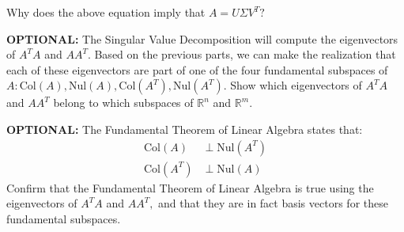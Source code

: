\begin{enumerate}
  \qitem Why does the above equation imply that $A = U \Sigma V^{T}?$


  \qitem \textbf{OPTIONAL:} The Singular Value Decomposition will compute the eigenvectors of $A^{T} A$ and $AA^{T}.$ 
  Based on the previous parts, we can make the realization that each of these eigenvectors are part of one of the four fundamental subspaces of $A: \text{Col}(A), \text{Nul}(A), \text{Col}(A^{T}), \text{Nul}(A^{T}).$
  Show which eigenvectors of $A^{T} A$ and $AA^{T}$ belong to which subspaces of $\mathbb{R}^{n}$ and $\mathbb{R}^{m}.$ 


  \qitem \textbf{OPTIONAL:} The Fundamental Theorem of Linear Algebra states that:
  \begin{align*}
    \text{Col}(A) &\perp \text{Nul}(A^{T}) \\
    \text{Col}(A^{T}) &\perp \text{Nul}(A)
  \end{align*}  
  Confirm that the Fundamental Theorem of Linear Algebra is true using the eigenvectors of $A^{T}A$ and $AA^{T},$ and that they are in fact basis vectors for these fundamental subspaces.


\end{enumerate}
